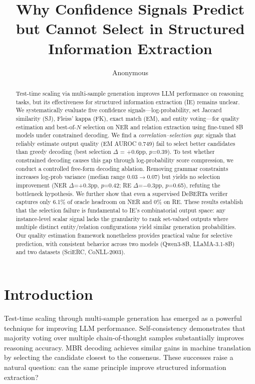 \documentclass[11pt,a4paper]{article}
\title{Why Confidence Signals Predict but Cannot Select in Structured Information Extraction}
\author{Anonymous}
\begin{document}
\maketitle

\begin{abstract}
Test-time scaling via multi-sample generation improves LLM performance on reasoning tasks, but its effectiveness for structured information extraction (IE) remains unclear.
We systematically evaluate five confidence signals---log-probability, set Jaccard similarity (SJ), Fleiss' kappa (FK), exact match (EM), and entity voting---for quality estimation and best-of-$N$ selection on NER and relation extraction using fine-tuned 8B models under constrained decoding.
We find a \emph{correlation--selection gap}: signals that reliably estimate output quality (EM AUROC 0.749) fail to select better candidates than greedy decoding (best selection $\Delta$ = +0.6pp, $p$=0.39).
To test whether constrained decoding causes this gap through log-probability score compression, we conduct a controlled free-form decoding ablation.
Removing grammar constraints increases log-prob variance (median range 0.03$\to$0.07) but yields no selection improvement (NER $\Delta$=+0.3pp, $p$=0.42; RE $\Delta$=$-$0.3pp, $p$=0.65), refuting the bottleneck hypothesis.
We further show that even a supervised DeBERTa verifier captures only 6.1\% of oracle headroom on NER and 0\% on RE.
These results establish that the selection failure is fundamental to IE's combinatorial output space: any instance-level scalar signal lacks the granularity to rank set-valued outputs where multiple distinct entity/relation configurations yield similar generation probabilities.
Our quality estimation framework nonetheless provides practical value for selective prediction, with consistent behavior across two models (Qwen3-8B, LLaMA-3.1-8B) and two datasets (SciERC, CoNLL-2003).
\end{abstract}

\section{Introduction}

Test-time scaling through multi-sample generation has emerged as a powerful technique for improving LLM performance. Self-consistency \cite{wang2023selfconsistency} demonstrates that majority voting over multiple chain-of-thought samples substantially improves reasoning accuracy. MBR decoding \cite{eikema2020map} achieves similar gains in machine translation by selecting the candidate closest to the consensus. These successes raise a natural question: can the same principle improve structured information extraction?
\end{document}
